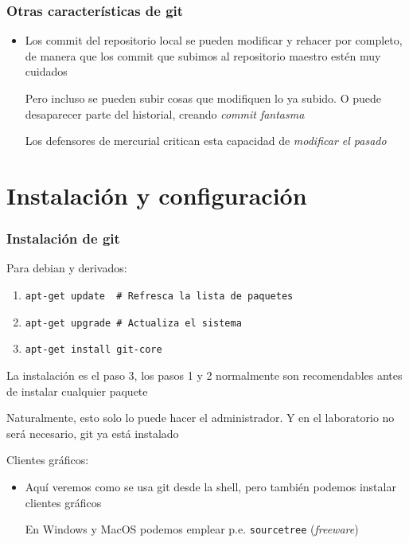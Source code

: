 \documentclass[ucs]{beamer}
\begin{document}
\begin{frame}[fragile]
\frametitle{Otras características de git}
\begin{itemize}
\item
Los commit del repositorio local se pueden modificar y rehacer por completo,
de manera que los commit que subimos al repositorio maestro estén muy cuidados

Pero incluso se pueden subir cosas que modifiquen lo ya subido. O puede
desaparecer parte del historial, creando \emph{commit fantasma}

Los defensores de mercurial critican esta capacidad de \emph{modificar el pasado}
\end{itemize}

\end{frame}


\section{Instalación y configuración}
\begin{frame}[fragile]
\frametitle{Instalación de git}
Para debian y derivados:
\begin{enumerate}
\item
\verb|apt-get update  # Refresca la lista de paquetes|
\item
\verb|apt-get upgrade # Actualiza el sistema|
\item
\verb|apt-get install git-core|
\end{enumerate}

La instalación es el paso 3, los pasos 1 y 2 normalmente son recomendables antes
de instalar cualquier paquete

Naturalmente, esto solo lo puede hacer el administrador. Y en el laboratorio
no será necesario, git ya está instalado

Clientes gráficos:

\begin{itemize}
\item
Aquí veremos como se usa git desde la shell, pero también
podemos instalar clientes gráficos

En Windows y MacOS podemos emplear p.e. \verb|sourcetree|
(\emph{freeware})
\end{itemize}


\end{frame}
\end{document}
